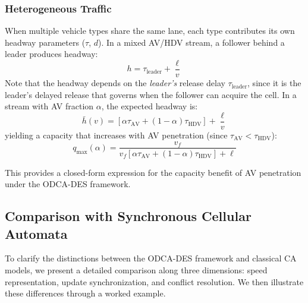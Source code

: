 \documentclass[review,authoryear]{elsarticle}
\begin{document}
\subsubsection{Heterogeneous Traffic}

When multiple vehicle types share the same lane, each type contributes its own headway parameters ($\tau$, $d$). In a mixed AV/HDV stream, a follower behind a leader produces headway:
\begin{equation}
    h = \tau_{\text{leader}} + \frac{\ell}{v}
    \label{eq:mixed_headway}
\end{equation}
Note that the headway depends on the \emph{leader's} release delay $\tau_{\text{leader}}$, since it is the leader's delayed release that governs when the follower can acquire the cell. In a stream with AV fraction $\alpha$, the expected headway is:
\begin{equation}
    \bar{h}(v) = \left[\alpha \tau_{\text{AV}} + (1-\alpha)\tau_{\text{HDV}}\right] + \frac{\ell}{v}
    \label{eq:mixed_avg_headway}
\end{equation}
yielding a capacity that increases with AV penetration (since $\tau_{\text{AV}} < \tau_{\text{HDV}}$):
\begin{equation}
    q_{\max}(\alpha) = \frac{v_f}{v_f\left[\alpha \tau_{\text{AV}} + (1-\alpha)\tau_{\text{HDV}}\right] + \ell}
    \label{eq:mixed_capacity}
\end{equation}

This provides a closed-form expression for the capacity benefit of AV penetration under the ODCA-DES framework.


\subsection{Comparison with Synchronous Cellular Automata}
\label{sec:ca_comparison}

To clarify the distinctions between the ODCA-DES framework and classical CA models, we present a detailed comparison along three dimensions: speed representation, update synchronization, and conflict resolution. We then illustrate these differences through a worked example.
\end{document}
